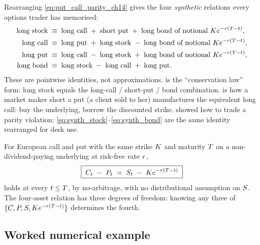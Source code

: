 Rearranging \eqref{eq:put_call_parity_ch14} gives the four
\emph{synthetic} relations every options trader has memorised:
\begin{align}
  \text{long stock}        \;&\equiv\;
    \text{long call} \;+\; \text{short put} \;+\;
    \text{long bond of notional } K e^{-r(T-t)},
    \label{eq:synth_stock} \\
  \text{long call}        \;&\equiv\;
    \text{long put} \;+\; \text{long stock} \;-\;
    \text{long bond of notional } K e^{-r(T-t)},
    \label{eq:synth_call} \\
  \text{long put}         \;&\equiv\;
    \text{long call} \;-\; \text{long stock} \;+\;
    \text{long bond of notional } K e^{-r(T-t)},
    \label{eq:synth_put} \\
  \text{long bond}        \;&\equiv\;
    \text{long stock} \;-\; \text{long call} \;+\; \text{long put}.
    \label{eq:synth_bond}
\end{align}
These are pointwise identities, not approximations.
 is the ``conservation law'' form: long
stock equals the long-call / short-put / bond combination.
 is how a market maker short a put (a client
sold to her) manufactures the equivalent long call: buy the
underlying, borrow the discounted strike.
 showed how to trade a parity violation;
\eqref{eq:synth_stock}--\eqref{eq:synth_bond} are the same
identity rearranged for desk use.

\begin{keyfactbox}
\label{kf:put_call_parity_ch14}
For European call and put with the same strike $K$ and
maturity $T$ on a non-dividend-paying underlying at
risk-free rate $r$,
\begin{equation*}
  \boxed{\;C_t \;-\; P_t \;=\; S_t \;-\; K e^{-r(T - t)}\;}
\end{equation*}
holds at every $t \leq T$, by no-arbitrage, with no
distributional assumption on $S$. The four-asset relation
has three degrees of freedom: knowing any three of
$\{C, P, S, K e^{-r(T-t)}\}$ determines
the fourth.
\end{keyfactbox}

\subsection{Worked numerical example}
\label{sec:ch14_parity_example}

